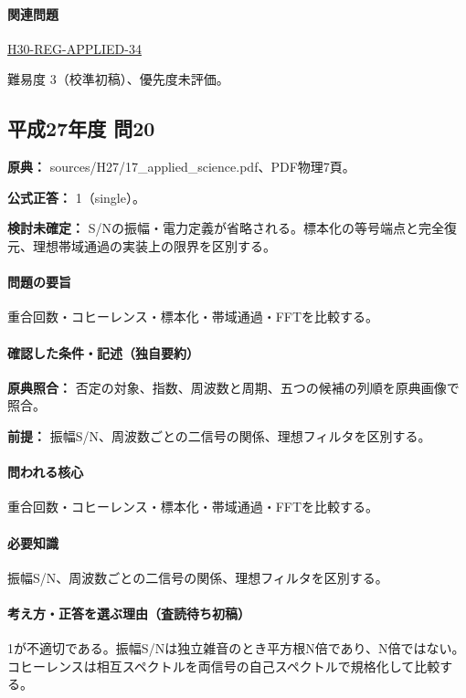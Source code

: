 \paragraph{関連問題} \hyperref[q:h30-reg-applied-34]{H30-REG-APPLIED-34}

\par 難易度 3（校準初稿）、優先度未評価。

\subsection{平成27年度 問20}
\label{q:h27-reg-applied-20}

\noindent\textbf{原典：} sources/H27/17\_applied\_science.pdf、PDF物理7頁。

\textbf{公式正答：} 1（single）。

\par\textbf{検討未確定：} S/Nの振幅・電力定義が省略される。標本化の等号端点と完全復元、理想帯域通過の実装上の限界を区別する。

\paragraph{問題の要旨} 重合回数・コヒーレンス・標本化・帯域通過・FFTを比較する。

\paragraph{確認した条件・記述（独自要約）}\mbox{}\par

\noindent\textbf{原典照合：} 否定の対象、指数、周波数と周期、五つの候補の列順を原典画像で照合。\par

\noindent\textbf{前提：} 振幅S/N、周波数ごとの二信号の関係、理想フィルタを区別する。\par

\paragraph{問われる核心} 重合回数・コヒーレンス・標本化・帯域通過・FFTを比較する。

\paragraph{必要知識} 振幅S/N、周波数ごとの二信号の関係、理想フィルタを区別する。

\paragraph{考え方・正答を選ぶ理由（査読待ち初稿）} 1が不適切である。振幅S/Nは独立雑音のとき平方根N倍であり、N倍ではない。コヒーレンスは相互スペクトルを両信号の自己スペクトルで規格化して比較する。

